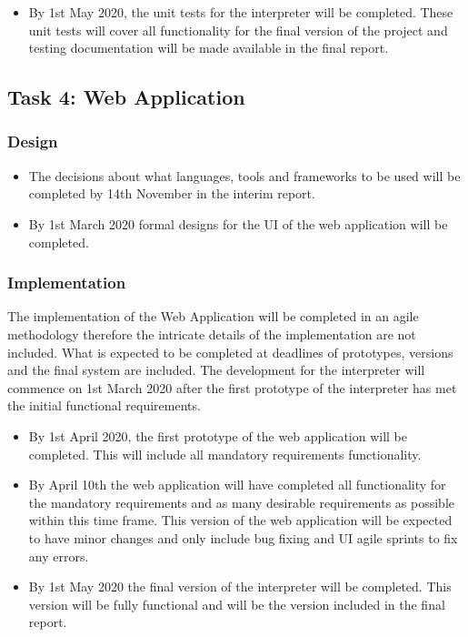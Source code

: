 \documentclass[chapterprefix=false]{scrreprt}
\begin{document}
\begin{itemize}
\setlength\itemsep{-0.75em}
 \item By 1st May 2020, the unit tests for the interpreter will be completed. These unit tests will cover all functionality for the final version of the project and testing documentation will be made available in the final report.
\end{itemize}

\subsection{Task 4: Web Application}

\subsubsection{Design}

\begin{itemize}
 \setlength\itemsep{-0.75em}
 \item The decisions about what languages, tools and frameworks to be used will be completed by 14th November in the interim report.
 \item By 1st March 2020 formal designs for the UI of the web application will be completed. 
\end{itemize}

\subsubsection{Implementation}

The implementation of the Web Application will be completed in an agile methodology therefore the intricate details of the implementation are not included. What is expected to be completed at deadlines of prototypes, versions and the final system are included. The development for the interpreter will commence on 1st March 2020 after the first prototype of the interpreter has met the initial functional requirements.

\begin{itemize}
 \setlength\itemsep{-0.75em}
 \item By 1st April 2020, the first prototype of the web application will be completed. This will include all mandatory requirements functionality.
 \item By April 10th the web application will have completed all functionality for the mandatory requirements and as many desirable requirements as possible within this time frame. This version of the web application will be expected to have minor changes and only include bug fixing and UI agile sprints to fix any errors.
 \item By 1st May 2020 the final version of the interpreter will be completed. This version will be fully functional and will be the version included in the final report.
\end{itemize}
\end{document}
